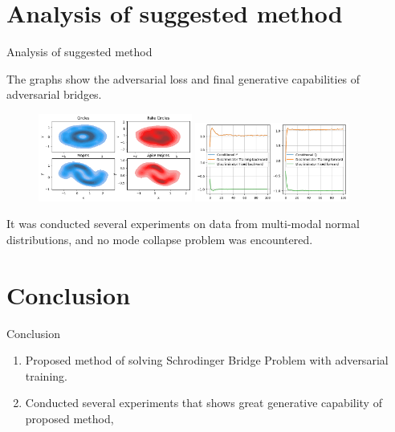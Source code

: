 \documentclass[10pt,pdf,hyperref={unicode}]{beamer}
\begin{document}
\section{Analysis of suggested method}
\begin{frame}{Analysis of suggested method}
\justifying

The graphs show the adversarial loss and final generative capabilities of adversarial bridges. 
\begin{figure}[h!]
\includegraphics[width=0.45\textwidth]{figures/results.png}
\includegraphics[width=0.45\textwidth]{figures/loss.png}
\end{figure}

It was conducted several experiments on data from multi-modal normal distributions, and no mode collapse problem was encountered.

\end{frame}

\section{Conclusion}
\begin{frame}{Conclusion}
\justifying
    \begin{enumerate}
        \justifying
        \item Proposed method of solving Schrodinger Bridge Problem with adversarial training.
        \item Conducted several experiments that shows great generative capability of proposed method, 
    \end{enumerate}
\end{frame}
\end{document}
